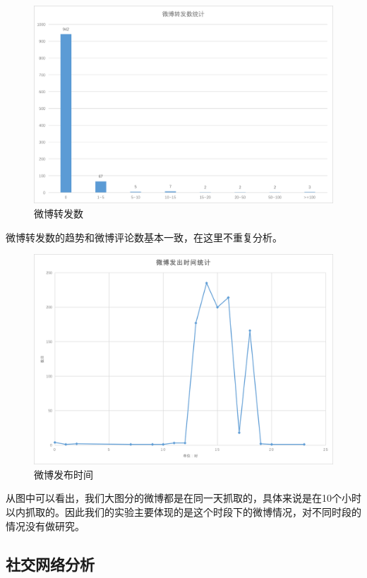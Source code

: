 \documentclass[a4paper,UTF8]{ctexart}
\begin{document}
\begin{figure}[htbp]
\centering
\includegraphics{img/post_repost.png}
\caption{微博转发数}
\end{figure}

微博转发数的趋势和微博评论数基本一致，在这里不重复分析。

\begin{figure}[htbp]
\centering
\includegraphics{img/post_time2.png}
\caption{微博发布时间}
\end{figure}

从图中可以看出，我们大图分的微博都是在同一天抓取的，具体来说是在10个小时以内抓取的。因此我们的实验主要体现的是这个时段下的微博情况，对不同时段的情况没有做研究。

\subsection{社交网络分析}\label{ux793eux4ea4ux7f51ux7edcux5206ux6790-1}
\end{document}
